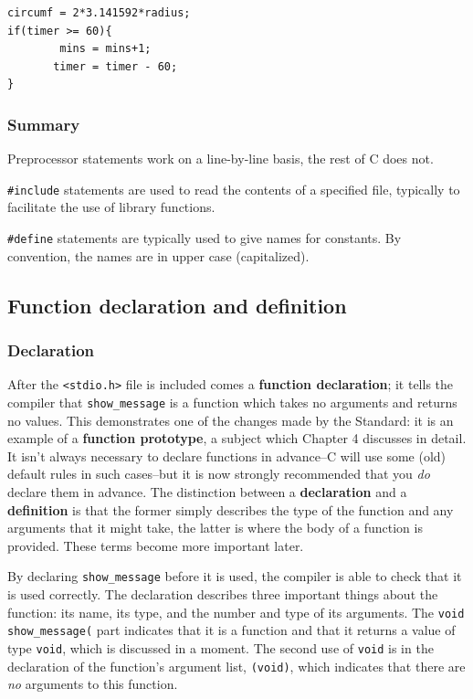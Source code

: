     \begin{Verbatim}
circumf = 2*3.141592*radius;
if(timer >= 60){
        mins = mins+1;
       timer = timer - 60;
}
\end{Verbatim}

   

   \subsubsection{Summary}
    Preprocessor statements work on a line-by-line basis, the rest of C does
     not.

    \texttt{\#include} statements are used to read the contents of a
     specified file, typically to facilitate the use of library functions.

    \texttt{\#define} statements are typically used to give names for
     constants. By convention, the names are in upper case (capitalized).

   

  

  \subsection{Function declaration and definition}
   

   \subsubsection{Declaration}
    

    After the \texttt{<stdio.h>} file is included comes a
     \textbf{function declaration}; it tells the compiler that
     \texttt{show\_message} is a function which takes no arguments and
     returns no values. This demonstrates one of the changes made by the
     Standard: it is an example of a \textbf{function prototype}, a subject
     which Chapter 4 discusses in detail. It isn't always
     necessary to declare functions in advance--C will use some (old)
     default rules in such cases--but it is now strongly recommended that
     you \textit{do} declare them in advance. The distinction between a
     \textbf{declaration} and a \textbf{definition} is that the former
     simply describes the type of the function and any arguments that it might
     take, the latter is where the body of a function is provided. These terms
     become more important later.


    By declaring \texttt{show\_message} before it is used, the compiler
     is able to check that it is used correctly. The declaration describes
     three important things about the function: its name, its type, and the
     number and type of its arguments. The \texttt{void show\_message(} part
     indicates that it is a function and that it returns a value of type
     \texttt{void}, which is discussed in a moment. The second use of
     \texttt{void} is in the declaration of the function's argument list,
     \texttt{(void)}, which indicates that there are \textit{no} arguments
     to this function.


